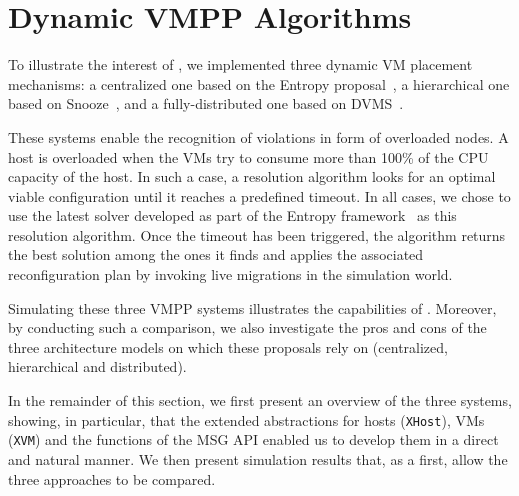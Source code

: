 \section{Dynamic VMPP Algorithms}
\label{sec:vm-schedulers}

To illustrate the interest of \vmps, we implemented three dynamic VM
placement mechanisms: a centralized one based on the Entropy
proposal~\cite{Hermenier:2009:ECM:1508293.1508300}, a hierarchical one
based on Snooze~\cite{feller:ccgrid12}, and a fully-distributed one
based on DVMS~\cite{quesnel:cpe2012}.


These systems enable the recognition of violations in form of
overloaded nodes. A host is overloaded when the VMs try to consume
more than 100\% of the CPU capacity of the host. In such a case, a
resolution algorithm looks for an optimal viable configuration until
it reaches a predefined timeout. In all cases, we chose to use the
latest solver developed as part of the Entropy
framework~\cite{hermenier:cp11} as this resolution algorithm.
Once the timeout has been triggered, the algorithm returns the best
solution among the ones it finds and applies the associated
reconfiguration plan by invoking live migrations in the simulation
world.
%
%

Simulating these three VMPP systems illustrates the capabilities of
\vmps. Moreover, by conducting such a comparison, we also investigate
the pros and cons of the three architecture models on which these
proposals rely on (\ie centralized, hierarchical and distributed).

In the remainder of this section, we first present an overview of the
three systems, showing, in particular, that the extended abstractions
for hosts (\texttt{XHost}), VMs (\texttt{XVM}) and the functions of
the \sg MSG API enabled us to develop them in a direct and natural
manner. We then present simulation results that, as a first, allow the
three approaches to be compared.

